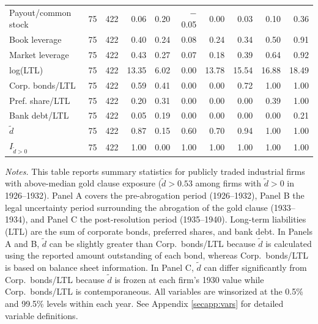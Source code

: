 \begin{table}[p]
\begin{threeparttable}
\begin{tabular}{lrrrrrrrrr}
            Payout/common stock & 75 & 422 & 0.06 & 0.20 & $-$0.05 & 0.00 & 0.03 & 0.10 & 0.36 \\
            Book leverage & 75 & 422 & 0.40 & 0.24 & 0.08 & 0.24 & 0.34 & 0.50 & 0.91 \\
            Market leverage & 75 & 422 & 0.43 & 0.27 & 0.07 & 0.18 & 0.39 & 0.64 & 0.92 \\
            log(LTL) & 75 & 422 & 13.35 & 6.02 & 0.00 & 13.78 & 15.54 & 16.88 & 18.49 \\
            Corp. bonds/LTL & 75 & 422 & 0.59 & 0.41 & 0.00 & 0.00 & 0.72 & 1.00 & 1.00 \\
            Pref. share/LTL & 75 & 422 & 0.20 & 0.31 & 0.00 & 0.00 & 0.00 & 0.39 & 1.00 \\
            Bank debt/LTL & 75 & 422 & 0.05 & 0.19 & 0.00 & 0.00 & 0.00 & 0.00 & 0.21 \\
            \ensuremath{\tilde{d}} & 75 & 422 & 0.87 & 0.15 & 0.60 & 0.70 & 0.94 & 1.00 & 1.00 \\
            \ensuremath{I_{\tilde{d}>0}} & 75 & 422 & 1.00 & 0.00 & 1.00 & 1.00 & 1.00 & 1.00 & 1.00 \\
            \bottomrule
        \end{tabular}
    \end{threeparttable}

    \vspace*{3mm} \justifying \noindent
\scriptsize{\textit{Notes.} This table reports summary statistics for publicly traded industrial firms with above-median gold clause exposure ($\tilde{d} > 0.53$ among firms with $\tilde{d} > 0$ in 1926--1932). Panel A covers the pre-abrogation period (1926--1932), Panel B the legal uncertainty period surrounding the abrogation of the gold clause (1933--1934), and Panel C the post-resolution period (1935--1940). Long-term liabilities (LTL) are the sum of corporate bonds, preferred shares, and bank debt. In Panels A and B, $\tilde{d}$ can be slightly greater than Corp.\ bonds/LTL because $\tilde{d}$ is calculated using the reported amount outstanding of each bond, whereas Corp.\ bonds/LTL is based on balance sheet information. In Panel C, $\tilde{d}$ can differ significantly from Corp.\ bonds/LTL because $\tilde{d}$ is frozen at each firm's 1930 value while Corp.\ bonds/LTL is contemporaneous. All variables are winsorized at the 0.5\% and 99.5\% levels within each year. See Appendix \ref{secapp:vars} for detailed variable definitions.}
\end{table}